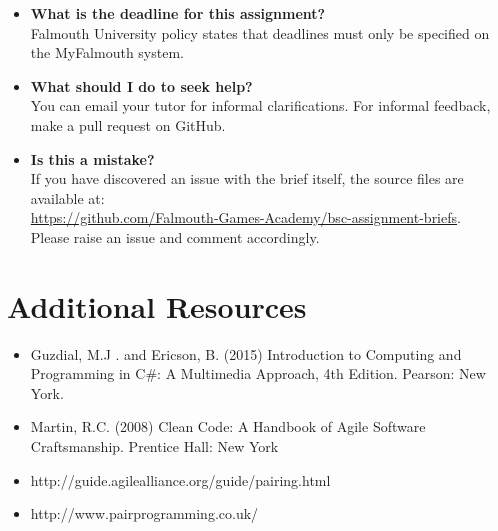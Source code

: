 \documentclass{../../fal_assignment}
\begin{document}
\begin{itemize}
	\item 	\textbf{What is the deadline for this assignment?} \\ 
    		Falmouth University policy states that deadlines must only be specified on the MyFalmouth system.
    		
	\item 	\textbf{What should I do to seek help?} \\ 
    		You can email your tutor for informal clarifications. For informal feedback, make a pull request on GitHub. 
    		
    	\item 	\textbf{Is this a mistake?} \\ 	
    		If you have discovered an issue with the brief itself, the source files are available at: \\
    		\url{https://github.com/Falmouth-Games-Academy/bsc-assignment-briefs}.\\
    		 Please raise an issue and comment accordingly.
\end{itemize}

\section*{Additional Resources}

\begin{itemize}
    \item Guzdial, M.J . and Ericson, B. (2015) Introduction to Computing and Programming in C\#: A Multimedia Approach, 4th Edition. Pearson: New York.
    \item Martin, R.C. (2008) Clean Code: A Handbook of Agile Software Craftsmanship. Prentice Hall: New York
    \item http://guide.agilealliance.org/guide/pairing.html
    \item http://www.pairprogramming.co.uk/
\end{itemize}
\end{document}
